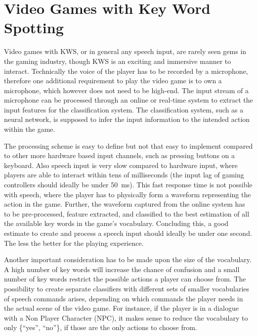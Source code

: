 
\section{Video Games with Key Word Spotting}\label{sec:intro_games}
Video games with KWS, or in general any speech input, are rarely seen gems in the gaming industry, though KWS is an exciting and immersive manner to interact.
Technically the voice of the player has to be recorded by a microphone, therefore one additional requirement to play the video game is to own a microphone, which however does not need to be high-end.
The input stream of a microphone can be processed through an online or real-time system to extract the input features for the classification system.
The classification system, such as a neural network, is supposed to infer the input information to the intended action within the game.

The processing scheme is easy to define but not that easy to implement compared to other more hardware based input channels, such as pressing buttons on a keyboard.
Also speech input is very slow compared to hardware input, where players are able to interact within tens of milliseconds (the input lag of gaming controllers should ideally be under \SI{50}{\milli\second}).
This fast response time is not possible with speech, where the player has to physically form a waveform representing the action in the game.
Further, the waveform captured from the online system has to be pre-processed, feature extracted, and classified to the best estimation of all the available key words in the game's vocabulary.
Concluding this, a good estimate to create and process a speech input should ideally be under one second. 
The less the better for the playing experience.

Another important consideration has to be made upon the size of the vocabulary.
A high number of key words will increase the chance of confusion and a small number of key words restrict the possible actions a player can choose from.
The possibility to create separate classifiers with different sets of smaller vocabularies of speech commands arises, depending on which commands the player needs in the actual scene of the video game.
For instance, if the player is in a dialogue with a Non Player Character (NPC), it makes sense to reduce the vocabulary to only \{\enquote{yes}, \enquote{no}\}, if those are the only actions to choose from.

